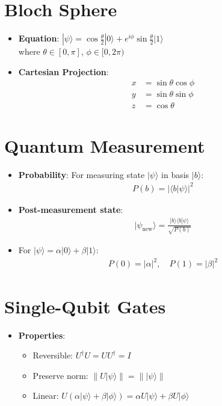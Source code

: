 \begin{multicols}{3}
    \section*{Bloch Sphere}
    \begin{itemize}[leftmargin=*,nosep,topsep=0pt]
      \item \textbf{Equation}: $|\psi\rangle = \cos\frac{\theta}{2}|0\rangle + e^{i\phi}\sin\frac{\theta}{2}|1\rangle$ \\
        where $\theta \in [0,\pi]$, $\phi \in [0,2\pi)$
      \item \textbf{Cartesian Projection}:
        \begin{align*}
          x &= \sin\theta\cos\phi \\
          y &= \sin\theta\sin\phi \\
          z &= \cos\theta
        \end{align*}
    \end{itemize}

    \section*{Quantum Measurement}
    \begin{itemize}[leftmargin=*,nosep,topsep=0pt]
      \item \textbf{Probability}: For measuring state $|\psi\rangle$ in basis $|b\rangle$:
        \begin{align*}
          P(b) = |\langle b|\psi\rangle|^2
        \end{align*}
      \item \textbf{Post-measurement state}:
        \begin{align*}
          |\psi_{\text{new}}\rangle = \frac{|b\rangle\langle b|\psi\rangle}{\sqrt{P(b)}}
        \end{align*}
      \item For $|\psi\rangle = \alpha|0\rangle + \beta|1\rangle$:
        \begin{align*}
          P(0) = |\alpha|^2, \quad P(1) = |\beta|^2
        \end{align*}
    \end{itemize}

    \section*{Single-Qubit Gates}
    \begin{itemize}[leftmargin=*,nosep,topsep=0pt]
      \item \textbf{Properties}:
        \begin{itemize}[nosep]
          \item Reversible: $U^\dagger U = UU^\dagger = I$
          \item Preserve norm: $\|U|\psi\rangle\| = \||\psi\rangle\|$
          \item Linear: $U(\alpha|\psi\rangle + \beta|\phi\rangle) = \alpha U|\psi\rangle + \beta U|\phi\rangle$
        \end{itemize}
    \end{itemize}


\end{multicols}
